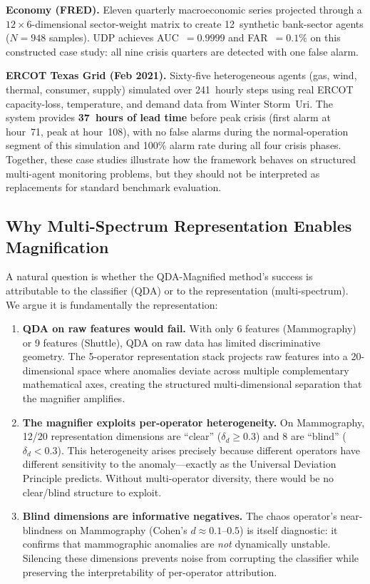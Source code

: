 \documentclass[journal]{IEEEtran}
\begin{document}
\textbf{Economy (FRED).} Eleven quarterly macroeconomic series projected through a $12{\times}6$-dimensional sector-weight matrix to create 12~synthetic bank-sector agents ($N{=}948$ samples). UDP achieves AUC~$= 0.9999$ and FAR~$= 0.1\%$ on this constructed case study: all nine crisis quarters are detected with one false alarm.

\textbf{ERCOT Texas Grid (Feb 2021).} Sixty-five heterogeneous agents (gas, wind, thermal, consumer, supply) simulated over 241~hourly steps using real ERCOT capacity-loss, temperature, and demand data from Winter Storm~Uri. The system provides \textbf{37~hours of lead time} before peak crisis (first alarm at hour~71, peak at hour~108), with no false alarms during the normal-operation segment of this simulation and 100\% alarm rate during all four crisis phases. Together, these case studies illustrate how the framework behaves on structured multi-agent monitoring problems, but they should not be interpreted as replacements for standard benchmark evaluation.

\subsection{Why Multi-Spectrum Representation Enables Magnification}
\label{ssec:why_magnifier}

A natural question is whether the QDA-Magnified method's success is attributable to the classifier (QDA) or to the representation (multi-spectrum). We argue it is fundamentally the representation:

\begin{enumerate}
  \item \textbf{QDA on raw features would fail.} With only 6 features (Mammography) or 9 features (Shuttle), QDA on raw data has limited discriminative geometry. The 5-operator representation stack projects raw features into a 20-dimensional space where anomalies deviate across multiple complementary mathematical axes, creating the structured multi-dimensional separation that the magnifier amplifies.
  \item \textbf{The magnifier exploits per-operator heterogeneity.} On Mammography, 12/20 representation dimensions are ``clear'' ($\delta_d \geq 0.3$) and 8 are ``blind'' ($\delta_d < 0.3$). This heterogeneity arises precisely because different operators have different sensitivity to the anomaly---exactly as the Universal Deviation Principle predicts. Without multi-operator diversity, there would be no clear/blind structure to exploit.
  \item \textbf{Blind dimensions are informative negatives.} The chaos operator's near-blindness on Mammography (Cohen's $d \approx 0.1$--$0.5$) is itself diagnostic: it confirms that mammographic anomalies are \textit{not} dynamically unstable. Silencing these dimensions prevents noise from corrupting the classifier while preserving the interpretability of per-operator attribution.
\end{enumerate}
\end{document}
